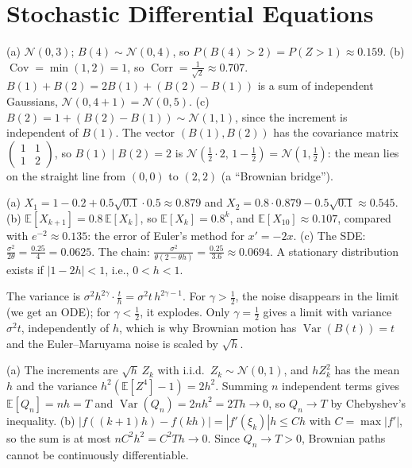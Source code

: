 \documentclass[11pt]{article}
\newcommand{\E}{\mathbb{E}}
\DeclareMathOperator{\Var}{Var}
\DeclareMathOperator{\Cov}{Cov}
\DeclareMathOperator{\Corr}{Corr}
\begin{document}
\section*{Stochastic Differential Equations}

\begin{description}[leftmargin=0pt, itemsep=0.3em]
    \item[\ref{pr:brownian}.] (a) $\mathcal{N}(0, 3)$; $B(4) \sim \mathcal{N}(0, 4)$, so $P(B(4) > 2) = P(Z > 1) \approx 0.159$. (b) $\Cov = \min(1, 2) = 1$, so $\Corr = \frac{1}{\sqrt{2}} \approx 0.707$. $B(1) + B(2) = 2B(1) + (B(2) - B(1))$ is a sum of independent Gaussians, $\mathcal{N}(0, 4 + 1) = \mathcal{N}(0, 5)$. (c) $B(2) = 1 + (B(2) - B(1)) \sim \mathcal{N}(1, 1)$, since the increment is independent of $B(1)$. The vector $(B(1), B(2))$ has the covariance matrix $\left(\begin{smallmatrix} 1 & 1 \\ 1 & 2 \end{smallmatrix}\right)$, so $B(1) \mid B(2) = 2$ is $\mathcal{N}(\frac{1}{2} \cdot 2, \, 1 - \frac{1}{2}) = \mathcal{N}(1, \frac{1}{2})$: the mean lies on the straight line from $(0, 0)$ to $(2, 2)$ (a ``Brownian bridge'').
    \item[\ref{pr:euler-maruyama}.] (a) $X_1 = 1 - 0.2 + 0.5\sqrt{0.1} \cdot 0.5 \approx 0.879$ and $X_2 = 0.8 \cdot 0.879 - 0.5\sqrt{0.1} \approx 0.545$. (b) $\E[X_{k+1}] = 0.8\,\E[X_k]$, so $\E[X_k] = 0.8^k$, and $\E[X_{10}] \approx 0.107$, compared with $e^{-2} \approx 0.135$: the error of Euler's method for $x' = -2x$. (c) The SDE: $\frac{\sigma^2}{2\theta} = \frac{0.25}{4} = 0.0625$. The chain: $\frac{\sigma^2}{\theta(2 - \theta h)} = \frac{0.25}{3.6} \approx 0.0694$. A stationary distribution exists if $|1 - 2h| < 1$, i.e., $0 < h < 1$.
    \item[\ref{pr:sqrt-h}.] The variance is $\sigma^2h^{2\gamma} \cdot \frac{t}{h} = \sigma^2t\,h^{2\gamma - 1}$. For $\gamma > \frac{1}{2}$, the noise disappears in the limit (we get an ODE); for $\gamma < \frac{1}{2}$, it explodes. Only $\gamma = \frac{1}{2}$ gives a limit with variance $\sigma^2t$, independently of $h$, which is why Brownian motion has $\Var(B(t)) = t$ and the Euler--Maruyama noise is scaled by $\sqrt{h}$.
    \item[\ref{pr:quadratic-variation}.] (a) The increments are $\sqrt{h}\,Z_k$ with i.i.d.\ $Z_k \sim \mathcal{N}(0, 1)$, and $hZ_k^2$ has the mean $h$ and the variance $h^2(\E[Z^4] - 1) = 2h^2$. Summing $n$ independent terms gives $\E[Q_n] = nh = T$ and $\Var(Q_n) = 2nh^2 = 2Th \to 0$, so $Q_n \to T$ by Chebyshev's inequality. (b) $|f((k + 1)h) - f(kh)| = |f'(\xi_k)|h \leq Ch$ with $C = \max|f'|$, so the sum is at most $nC^2h^2 = C^2Th \to 0$. Since $Q_n \to T > 0$, Brownian paths cannot be continuously differentiable.
\end{description}
\end{document}
